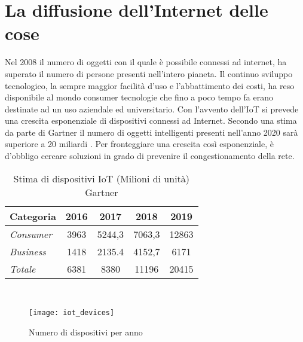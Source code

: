 \section{La diffusione dell'Internet delle cose}
Nel 2008 il numero di oggetti con il quale è possibile
connessi ad internet, ha superato il numero di persone presenti nell'intero
pianeta. Il continuo sviluppo tecnologico, la sempre maggior facilità d'uso e
l'abbattimento dei costi, ha reso disponibile al mondo consumer tecnologie che
fino a poco tempo fa erano destinate ad un uso aziendale ed universitario. 
Con l'avvento dell'IoT si prevede una crescita esponenziale di dispositivi connessi
ad Internet. Secondo  una stima da parte di Gartner il numero di oggetti
intelligenti presenti nell'anno 2020 sarà superiore a 20 miliardi \cite{gartner2016}.
Per fronteggiare una crescita così esponenziale, è d'obbligo cercare soluzioni
in grado di prevenire il congestionamento della rete. 
\\
\begin{table}[ht]
        \centering
        \begin{tabular}{l|c|c|c|c}
                \textbf{Categoria}  & 2016 & 2017 & 2018 & 2019 \\
                \hline
                \emph{Consumer}  & 3963 & 5244,3 & 7063,3 & 12863 \\
                \emph{Business}  & 1418 & 2135.4 & 4152,7 & 6171  \\
                \emph{Totale }   & 6381 & 8380   & 11196  & 20415 \\
        \end{tabular}
        \caption{Stima di dispositivi IoT (Milioni di unità)
        Gartner\cite{gartner2016}}
\end{table}
\\
\begin{figure}[ht]
        \centering 
                \texttt{[image: iot\_devices]}
        \caption{Numero di dispositivi per anno}
\end{figure}

